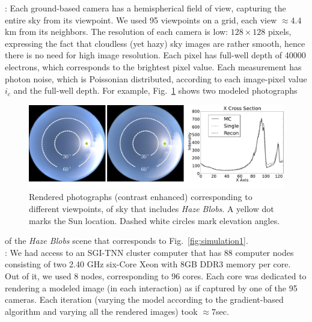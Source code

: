 \documentclass[10pt,twocolumn,letterpaper]{article}
\newcommand{\yoavcomment}[1]{}
\renewcommand{\yoavcomment}[1]{#1} %
\begin{document}
: Each ground-based camera has a hemispherical
field of view, capturing the entire sky from its viewpoint. We used 95
viewpoints on a grid, each view $\approx 4.4$km from its neighbors.
The resolution of each camera is low: $128\times 128$ pixels,
expressing the fact that cloudless (yet hazy) sky images are rather
smooth, hence there is no need for high image resolution. Each pixel
has full-well depth of 40000 electrons, which corresponds to the
brightest pixel value. Each measurement has photon noise, which is
Poissonian distributed, according to each image-pixel value $i_c$ and
the full-well depth. For example, Fig.~\ref{fig:simulation-results1}
shows two modeled photographs
\begin{figure}
  \centering
  \yoavcomment{\includegraphics[width=\columnwidth]{images/ref_images.pdf}}
  \caption{\small Rendered photographs (contrast enhanced)
    corresponding to different viewpoints, of sky that includes {\em
      Haze Blobs}. A yellow dot marks the Sun location. Dashed white
    circles mark elevation angles.}
  \label{fig:simulation-results1}
\end{figure}
of the  {\em Haze Blobs} scene that corresponds to Fig.~\ref{fig:simulation1}.\\


: We had access to an SGI-TNN cluster computer
that has 88 computer nodes consisting of two 2.40 GHz six-Core Xeon
with 8GB
DDR3 memory per core. Out of it, we used 8 nodes, corresponding to 96 cores. Each core was dedicated to rendering a modeled image (in each interaction) as if captured by one of the 95 cameras. Each iteration (varying the model according to the gradient-based algorithm and varying all the rendered images) took $\approx 7$sec.\\
\end{document}
